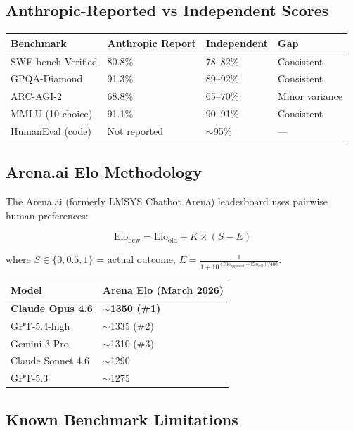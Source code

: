 \documentclass[11pt,a4paper]{article}
\begin{document}
\subsection{Anthropic-Reported vs Independent Scores}

\begin{center}
\begin{tabular}{llll}
\toprule
\textbf{Benchmark} & \textbf{Anthropic Report} & \textbf{Independent} & \textbf{Gap} \\
\midrule
SWE-bench Verified & 80.8\% & 78--82\% & Consistent \\
GPQA-Diamond & 91.3\% & 89--92\% & Consistent \\
ARC-AGI-2 & 68.8\% & 65--70\% & Minor variance \\
MMLU (10-choice) & 91.1\% & 90--91\% & Consistent \\
HumanEval (code) & Not reported & $\sim$95\% & --- \\
\bottomrule
\end{tabular}
\end{center}

\subsection{Arena.ai Elo Methodology}

The Arena.ai (formerly LMSYS Chatbot Arena) leaderboard uses pairwise human preferences:

$$\text{Elo}_{\text{new}} = \text{Elo}_{\text{old}} + K \times (S - E)$$

where $S \in \{0, 0.5, 1\}$ = actual outcome, $E = \frac{1}{1 + 10^{(\text{Elo}_{\text{opponent}} - \text{Elo}_{\text{self}})/400}}$.

\begin{center}
\begin{tabular}{ll}
\toprule
\textbf{Model} & \textbf{Arena Elo (March 2026)} \\
\midrule
\textbf{Claude Opus 4.6} & \textbf{$\sim$1350 (\#1)} \\
GPT-5.4-high & $\sim$1335 (\#2) \\
Gemini-3-Pro & $\sim$1310 (\#3) \\
Claude Sonnet 4.6 & $\sim$1290 \\
GPT-5.3 & $\sim$1275 \\
\bottomrule
\end{tabular}
\end{center}

\subsection{Known Benchmark Limitations}
\end{document}
